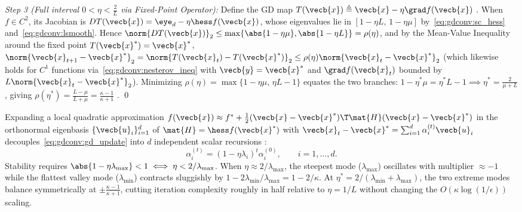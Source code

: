 \documentclass[../../../../master.tex]{subfiles}
\begin{document}
\emph{Step 3 (Full interval $0 < \eta < \frac{2}{L}$ via Fixed-Point Operator):} Define the GD map $T(\vecb{x}) \triangleq \vecb{x} - \eta\grad f(\vecb{x})$ . When $f \in C^2$, its Jacobian is $DT(\vecb{x}) = \eye_d - \eta\hess f(\vecb{x})$, whose eigenvalues lie in $[1 - \eta L,\, 1 - \eta\mu]$ by~\eqref{eq:gdconv:sc_hess} and~\eqref{eq:gdconv:lsmooth}. Hence $\norm{DT(\vecb{x})}_2 \le \max\{\abs{1 - \eta\mu}, \abs{1 - \eta L}\} = \rho(\eta)$, and by the Mean-Value Inequality around the fixed point $T(\vecb{x}^*) = \vecb{x}^*$, $\norm{\vecb{x}_{t+1}-\vecb{x}^*}_2 = \norm{T(\vecb{x}_t) - T(\vecb{x}^*)}_2 \le \rho(\eta)\norm{\vecb{x}_t - \vecb{x}^*}_2$ (which likewise holds for $C^1$ functions via~\eqref{eq:gdconv:nesterov_ineq} with $\vecb{y}=\vecb{x}^*$ and $\grad f(\vecb{x}_t)$ bounded by $L\norm{\vecb{x}_t-\vecb{x}^*}_2$). Minimizing $\rho(\eta) = \max\{1 - \eta\mu,\, \eta L - 1\}$ equates the two branches: $1 - \eta^*\mu = \eta^* L - 1 \implies \eta^* = \frac{2}{\mu + L}$, giving $\rho(\eta^*) = \frac{L - \mu}{L + \mu} = \frac{\kappa - 1}{\kappa + 1}$  . \qed

\begin{intuition}
Expanding a local quadratic approximation $f(\vecb{x}) \approx f^* + \frac{1}{2}(\vecb{x}-\vecb{x}^*)\T \mat{H} (\vecb{x}-\vecb{x}^*)$ in the orthonormal eigenbasis $\{\vecb{u}_i\}_{i=1}^d$ of $\mat{H} = \hess f(\vecb{x}^*)$ with $\vecb{x}_t - \vecb{x}^* = \sum_{i=1}^d \alpha_i^{(t)} \vecb{u}_i$ decouples~\eqref{eq:gdconv:gd_update} into $d$ independent scalar recursions :
\[
  \alpha_i^{(t)} = (1 - \eta \lambda_i)^t \alpha_i^{(0)}, \qquad i = 1, \dots, d.
\]
Stability requires $\abs{1 - \eta\lambda_{\max}} < 1 \iff \eta < 2/\lambda_{\max}$. When $\eta \approx 2/\lambda_{\max}$, the steepest mode ($\lambda_{\max}$) oscillates with multiplier $\approx -1$ while the flattest valley mode ($\lambda_{\min}$) contracts sluggishly by $1 - 2\lambda_{\min}/\lambda_{\max} = 1 - 2/\kappa$. At $\eta^* = 2/(\lambda_{\min}+\lambda_{\max})$, the two extreme modes balance symmetrically at $\pm\frac{\kappa - 1}{\kappa + 1}$, cutting iteration complexity roughly in half relative to $\eta = 1/L$ without changing the $O(\kappa \log(1/\epsilon))$ scaling.
\end{intuition}
\end{document}
